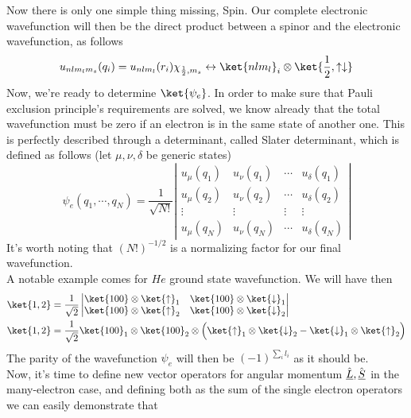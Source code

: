 \documentclass[../qm.tex]{subfiles}
\begin{document}
	Now there is only one simple thing missing, Spin. Our complete electronic wavefunction will then be the direct product between a spinor and the electronic wavefunction, as follows
	\begin{equation}
		u_{nlm_lm_s}(q_i)=u_{nlm_l}(r_i)\chi_{\frac{1}{2},m_s}\leftrightarrow\ket{nlm_l}_i\otimes\ket{\frac{1}{2},\up\down}
		\label{eq:spinelectronwfmanyelectrons}
	\end{equation}
	Now, we're ready to determine $\ket{\psi_e}$. In order to make sure that Pauli exclusion principle's requirements are solved, we know already that the total wavefunction must be zero if an electron is in the same state of another one. This is perfectly described through a determinant, called Slater determinant, which is defined as follows (let $\mu,\nu,\delta$ be generic states)
	\begin{equation}
		\psi_e(q_1,\cdots,q_N)=\frac{1}{\sqrt{N!}}\left|\begin{matrix}u_{\mu}(q_1)&u_{\nu}(q_1)&\cdots&u_{\delta}(q_1)\\u_\mu(q_2)&u_\nu(q_2)&\cdots&u_\delta(q_2)\\\vdots&\vdots&\vdots&\vdots\\u_\mu(q_N)&u_\nu(q_N)&\cdots&u_\delta(q_N)\end{matrix}\right|
		\label{eq:slaterdeterminantatomic}
	\end{equation}
	It's worth noting that $(N!)^{-1/2}$ is a normalizing factor for our final wavefunction.\\
	A notable example comes for $He$ ground state wavefunction. We will have then
	\begin{equation}
		\begin{aligned}
			\ket{1,2}&=\frac{1}{\sqrt{2}}\left|\begin{matrix}\ket{100}\otimes\ket{\up}_1&\ket{100}\otimes\ket{\down}_1\\\ket{100}\otimes\ket{\up}_2&\ket{100}\otimes\ket{\down}_2\end{matrix}\right|\\
			\ket{1,2}&=\frac{1}{\sqrt{2}}\ket{100}_1\otimes\ket{100}_2\otimes\Big( \ket{\up}_1\otimes\ket{\down}_2-\ket{\down}_1\otimes\ket{\up}_2 \Big)
		\end{aligned}
		\label{eq:slaterhelium}
	\end{equation}
	The parity of the wavefunction $\psi_e$ will then be $(-1)^{\sum_il_i}$ as it should be.\\
	Now, it's time to define new vector operators for angular momentum $\hat{\underline{L}},\hat{\underline{S}}$ in the many-electron case, and defining both as the sum of the single electron operators we can easily demonstrate that
\end{document}
